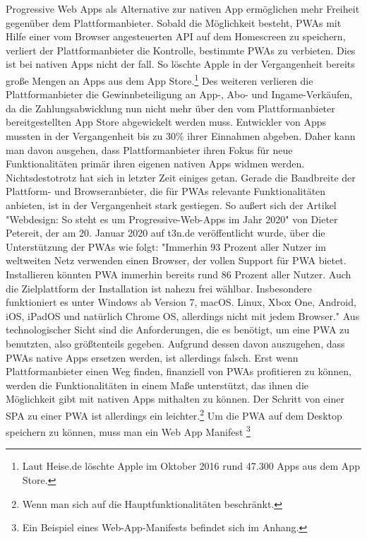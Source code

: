 Progressive Web Apps als Alternative zur nativen App ermöglichen mehr Freiheit gegenüber dem
Plattformanbieter. Sobald die Möglichkeit besteht, PWAs mit Hilfe einer vom Browser angesteuerten API
auf dem Homescreen zu speichern, verliert der Plattformanbieter die Kontrolle,
bestimmte PWAs zu verbieten. Dies ist bei nativen Apps nicht der fall. So löschte Apple in der Vergangenheit
bereits große Mengen an Apps aus dem App Store.\footnote{Laut Heise.de löschte Apple im Oktober 2016 rund 47.300 Apps aus dem App Store.\cite{HeiseAppleLoeschtApps}} 
Des weiteren verlieren die Plattformanbieter die Gewinnbeteiligung an App-, Abo- und Ingame-Verkäufen,
da die Zahlungsabwicklung nun nicht mehr über den vom Plattformanbieter bereitgestellten App Store
abgewickelt werden muss. Entwickler von Apps mussten in der Vergangenheit bis zu 30\% 
ihrer Einnahmen abgeben. \cite{WinFutureEigenerAppStore} Daher kann man davon ausgehen,
dass Plattformanbieter ihren Fokus für neue Funktionalitäten primär ihren eigenen
nativen Apps widmen werden. Nichtsdestotrotz hat sich in letzter Zeit einiges getan.
Gerade die Bandbreite der Plattform- und Browseranbieter, die für PWAs relevante
Funktionalitäten anbieten, ist in der Vergangenheit stark gestiegen. So außert sich der Artikel
"Webdesign: So steht es um Progressive-Web-Apps im Jahr 2020" von Dieter Petereit,
der am 20. Januar 2020 auf t3n.de veröffentlicht wurde, über die Unterstützung der PWAs wie folgt:
"Immerhin 93 Prozent aller Nutzer im weltweiten Netz verwenden einen Browser, der vollen Support
für PWA bietet. Installieren könnten PWA immerhin bereits rund 86 Prozent aller Nutzer. Auch
die Zielplattform der Installation ist nahezu frei wählbar. Insbesondere funktioniert es
unter Windows ab Version 7, macOS. Linux, Xbox One, Android, iOS, iPadOS und natürlich Chrome OS,
allerdings nicht mit jedem Browser."\cite{T3NPWASupport} Aus technologischer Sicht sind die
Anforderungen, die es benötigt, um eine PWA zu benutzten, also größtenteils gegeben.
Aufgrund dessen davon auszugehen, dass PWAs native Apps ersetzen werden, ist allerdings
falsch. Erst wenn Plattformanbieter einen Weg finden, finanziell von PWAs profitieren
zu können, werden die Funktionalitäten in einem Maße unterstützt, das ihnen die Möglichkeit
gibt mit nativen Apps mithalten zu können. Der Schritt von einer SPA zu einer
PWA ist allerdings ein leichter.\footnote{Wenn man sich auf die Hauptfunktionalitäten beschränkt.}
Um die PWA auf dem Desktop speichern zu können, muss man ein Web App Manifest
\footnote{Ein Beispiel eines Web-App-Manifests befindet sich im Anhang.}
